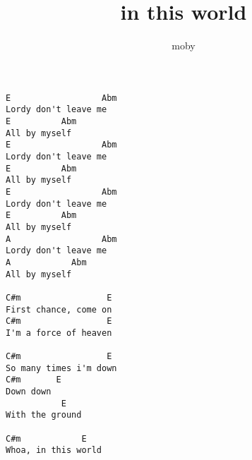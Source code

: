 \author{moby}
\title{in this world}
\maketitle
\begin{verbatim}
E                  Abm
Lordy don't leave me
E          Abm
All by myself
E                  Abm
Lordy don't leave me
E          Abm
All by myself
E                  Abm
Lordy don't leave me
E          Abm
All by myself
A                  Abm
Lordy don't leave me
A            Abm
All by myself

C#m                 E
First chance, come on
C#m                 E
I'm a force of heaven

C#m                 E
So many times i'm down
C#m       E
Down down
           E
With the ground

C#m            E
Whoa, in this world
\end{verbatim}